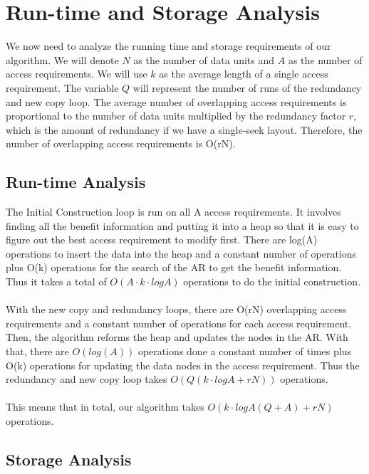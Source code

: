 \documentclass[conference]{acmsiggraph}
\begin{document}
\section{Run-time and Storage Analysis}

We now need to analyze the running time and storage requirements of our algorithm. We will denote $N$ as the number of data units and $A$ as the number of access requirements. We will use $k$ as the average length of a single access requirement. The variable $Q$ will represent the number of runs of the redundancy and new copy loop. The average number of overlapping access requirements is proportional to the number of data units multiplied by the redundancy factor $r$, which is the amount of redundancy if we have a single-seek layout. Therefore, the number of overlapping access requirements is O(rN). 

\subsection{Run-time Analysis}

The Initial Construction loop is run on all A access requirements. It involves finding all the benefit information and putting it into a heap so that it is easy to figure out the best access requirement to modify first. There are log(A) operations to insert the data into the heap and a constant number of operations plus O(k) operations for the search of the AR to get the benefit information. Thus it takes a total of $O(A \cdot k \cdot logA)$ operations to do the initial construction. \\
\\
With the new copy and redundancy loops, there are O(rN) overlapping access requirements and a constant number of operations for each access requirement. Then, the algorithm reforms the heap and updates the nodes in the AR. With that, there are $O(log(A))$ operations done a constant number of times plus O(k) operations for updating the data nodes in the access requirement. Thus the redundancy and new copy loop takes $O(Q(k \cdot logA + rN))$ operations. \\
\\
This means that in total, our algorithm takes $O( k \cdot logA (Q+A) + rN)$ operations. 

\subsection{Storage Analysis}
\end{document}
